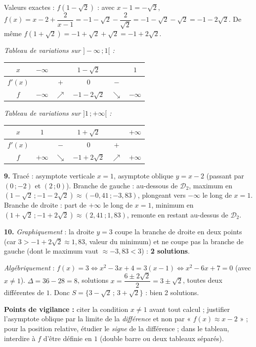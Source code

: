 \documentclass[11pt]{article}
\begin{document}
\begin{corrige}
Valeurs exactes : $f(1-\sqrt{2})$ : avec $x-1=-\sqrt{2}$, $f(x)=x-2+\dfrac{2}{x-1}=-1-\sqrt{2}-\dfrac{2}{\sqrt{2}}=-1-\sqrt{2}-\sqrt{2}=-1-2\sqrt{2}$. De même $f(1+\sqrt{2})=-1+\sqrt{2}+\sqrt{2}=-1+2\sqrt{2}$.

\emph{Tableau de variations sur $]-\infty\,;1[$ :}
\begin{center}
\begin{tabular}{|c|ccccc|}\hline
$x$ & $-\infty$ & & $1-\sqrt{2}$ & & $1$ \\ \hline
$f'(x)$ & & $+$ & $0$ & $-$ & \\ \hline
$f$ & $-\infty$ & $\nearrow$ & $-1-2\sqrt{2}$ & $\searrow$ & $-\infty$ \\ \hline
\end{tabular}
\end{center}

\emph{Tableau de variations sur $]1\,;+\infty[$ :}
\begin{center}
\begin{tabular}{|c|ccccc|}\hline
$x$ & $1$ & & $1+\sqrt{2}$ & & $+\infty$ \\ \hline
$f'(x)$ & & $-$ & $0$ & $+$ & \\ \hline
$f$ & $+\infty$ & $\searrow$ & $-1+2\sqrt{2}$ & $\nearrow$ & $+\infty$ \\ \hline
\end{tabular}
\end{center}

\textbf{9.} Tracé : asymptote verticale $x=1$, asymptote oblique $y=x-2$ (passant par $(0\,;-2)$ et $(2\,;0)$). Branche de gauche : au-dessous de $\mathcal{D}_2$, maximum en $(1-\sqrt{2}\,;-1-2\sqrt{2})\approx(-0{,}41\,;-3{,}83)$, plongeant vers $-\infty$ le long de $x=1$. Branche de droite : part de $+\infty$ le long de $x=1$, minimum en $(1+\sqrt{2}\,;-1+2\sqrt{2})\approx(2{,}41\,;1{,}83)$, remonte en restant au-dessus de $\mathcal{D}_2$.

\textbf{10.} \emph{Graphiquement} : la droite $y=3$ coupe la branche de droite en deux points (car $3>-1+2\sqrt{2}\approx 1{,}83$, valeur du minimum) et ne coupe pas la branche de gauche (dont le maximum vaut $\approx -3{,}83<3$) : \textbf{2 solutions}.

\emph{Algébriquement} : $f(x)=3\iff x^2-3x+4=3(x-1)\iff x^2-6x+7=0$ (avec $x\neq 1$). $\Delta=36-28=8$, solutions $x=\dfrac{6\pm 2\sqrt{2}}{2}=3\pm\sqrt{2}$, toutes deux différentes de $1$. Donc $S=\{3-\sqrt{2}\,;\,3+\sqrt{2}\}$ : bien 2 solutions.

\textbf{Points de vigilance :} citer la condition $x\neq 1$ avant tout calcul ; justifier l'asymptote oblique par la limite de la \emph{différence} et non par « $f(x)\approx x-2$ » ; pour la position relative, étudier le \emph{signe} de la différence ; dans le tableau, interdire à $f$ d'être définie en $1$ (double barre ou deux tableaux séparés).
\end{corrige}
\end{document}
